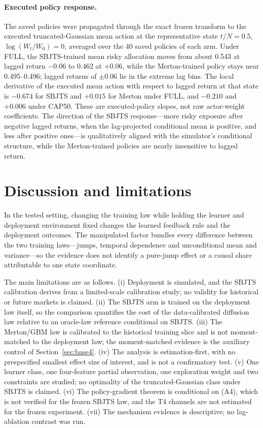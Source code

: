 \documentclass[11pt]{article}
\begin{document}
\paragraph{Executed policy response.} The saved policies were propagated through the exact frozen transform to the executed truncated-Gaussian mean action at the representative state $t/N=0.5$, $\log(W_t/W_0)=0$, averaged over the 40 saved policies of each arm. Under FULL, the SBJTS-trained mean risky allocation moves from about 0.543 at lagged return $-0.06$ to 0.462 at $+0.06$, while the Merton-trained policy stays near 0.495--0.496; lagged returns of $\pm0.06$ lie in the extreme lag bins. The local derivative of the executed mean action with respect to lagged return at that state is $-0.674$ for SBJTS and $+0.015$ for Merton under FULL, and $-0.210$ and $+0.006$ under CAP50. These are executed-policy slopes, not raw actor-weight coefficients. The direction of the SBJTS response---more risky exposure after negative lagged returns, when the lag-projected conditional mean is positive, and less after positive ones---is qualitatively aligned with the simulator's conditional structure, while the Merton-trained policies are nearly insensitive to lagged return.

\section{Discussion and limitations}\label{sec:discussion}
In the tested setting, changing the training law while holding the learner and deployment environment fixed changes the learned feedback rule and the deployment outcomes. The manipulated factor bundles every difference between the two training laws---jumps, temporal dependence and unconditional mean and variance---so the evidence does not identify a pure-jump effect or a causal share attributable to one state coordinate.

The main limitations are as follows. (i) Deployment is simulated, and the SBJTS calibration derives from a limited-scale calibration study; no validity for historical or future markets is claimed. (ii) The SBJTS arm is trained on the deployment law itself, so the comparison quantifies the cost of the data-calibrated diffusion law relative to an oracle-law reference conditional on SBJTS. (iii) The Merton/GBM law is calibrated to the historical training slice and is not moment-matched to the deployment law; the moment-matched evidence is the auxiliary control of Section~\ref{sec:base4}. (iv) The analysis is estimation-first, with no prespecified smallest effect size of interest, and is not a confirmatory test. (v) One learner class, one four-feature partial observation, one exploration weight and two constraints are studied; no optimality of the truncated-Gaussian class under SBJTS is claimed. (vi) The policy-gradient theorem is conditional on (A4), which is not verified for the frozen SBJTS law, and the T4 channels are not estimated for the frozen experiment. (vii) The mechanism evidence is descriptive; no lag-ablation contrast was run.
\end{document}

